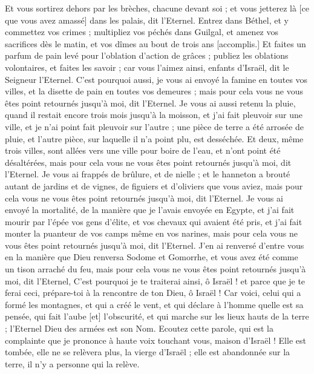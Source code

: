 \begin{multicols}{2}
Et vous sortirez dehors par les brèches, chacune devant soi ; et vous jetterez là [ce que vous avez amassé] dans les palais, dit l'Eternel.
Entrez dans Béthel, et y commettez vos crimes ; multipliez vos péchés dans Guilgal, et amenez vos sacrifices dès le matin, et vos dîmes au bout de trois ans [accomplis.]
Et faites un parfum de pain levé pour l'oblation d'action de grâces ; publiez les oblations volontaires, et faites les savoir ; car vous l'aimez ainsi, enfants d'Israël, dit le Seigneur l'Eternel.
C'est pourquoi aussi, je vous ai envoyé la famine en toutes vos villes, et la disette de pain en toutes vos demeures ; mais pour cela vous ne vous êtes point retournés jusqu'à moi, dit l'Eternel.
Je vous ai aussi retenu la pluie, quand il restait encore trois mois jusqu'à la moisson, et j'ai fait pleuvoir sur une ville, et je n'ai point fait pleuvoir sur l'autre ; une pièce de terre a été arrosée de pluie, et l'autre pièce, sur laquelle il n'a point plu, est desséchée.
Et deux, même trois villes, sont allées vers une ville pour boire de l'eau, et n'ont point été désaltérées, mais pour cela vous ne vous êtes point retournés jusqu'à moi, dit l'Eternel.
Je vous ai frappés de brûlure, et de nielle ; et le hanneton a brouté autant de jardins et de vignes, de figuiers et d'oliviers que vous aviez, mais pour cela vous ne vous êtes point retournés jusqu'à moi, dit l'Eternel.
Je vous ai envoyé la mortalité, de la manière que je l'avais envoyée en Egypte, et j'ai fait mourir par l'épée vos gens d'élite, et vos chevaux qui avaient été pris, et j'ai fait monter la puanteur de vos camps même en vos narines, mais pour cela vous ne vous êtes point retournés jusqu'à moi, dit l'Eternel.
J'en ai renversé d'entre vous en la manière que Dieu renversa Sodome et Gomorrhe, et vous avez été comme un tison arraché du feu, mais pour cela vous ne vous êtes point retournés jusqu'à moi, dit l'Eternel,
C'est pourquoi je te traiterai ainsi, ô Israël ! et parce que je te ferai ceci, prépare-toi à la rencontre de ton Dieu, ô Israël !
Car voici, celui qui a formé les montagnes, et qui a créé le vent, et qui déclare à l'homme quelle est sa pensée, qui fait l'aube [et] l'obscurité, et qui marche sur les lieux hauts de la terre ; l'Eternel Dieu des armées est son Nom.
\VerseOne{}Ecoutez cette parole, qui est la complainte que je prononce à haute voix touchant vous, maison d'Israël !
Elle est tombée, elle ne se relèvera plus, la vierge d'Israël ; elle est abandonnée sur la terre, il n'y a personne qui la relève.

\end{multicols}
